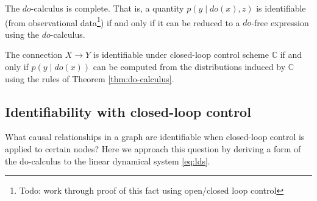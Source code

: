 \begin{theorem}
    \label{thm:do-calculus-completeness}
    The $do$-calculus is complete. That is, a quantity $p(y \mid do(x), z)$ is identifiable (from observational data\footnote{Todo: work through proof of this fact using open/closed loop control}) if and only if it can be reduced to a $do$-free expression using the $do$-calculus.
\end{theorem}

\begin{corollary}
    The connection $X \to Y$ is identifiable under closed-loop control scheme $\mathbb{C}$ if and only if $p(y \mid do(x))$ can be computed from the distributions induced by $\mathbb{C}$ using the rules of Theorem \ref{thm:do-calculus}.
\end{corollary}

\subsection{Identifiability with closed-loop control}

What causal relationships in a graph are identifiable when closed-loop control is applied to certain nodes? Here we approach this question by deriving a form of the do-calculus to the linear dynamical system \eqref{eq:lds}.

